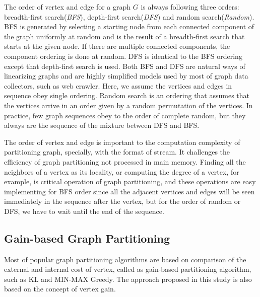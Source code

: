 \documentclass{sig-alternate-2013}
\begin{document}
The order of vertex and edge for a graph $G$ is always following three orders: breadth-first search(\textit{BFS}), depth-first search(\textit{DFS}) and random search(\textit{Random}). BFS is generated by selecting a starting node from each connected component of the graph uniformly at random and is the result of a breadth-first search that starts at the given node. If there are multiple connected components, the component ordering is done at random. DFS is identical to the BFS ordering except that depth-first search is used. Both BFS and DFS are natural ways of linearizing graphs and are highly simplified models used by most of graph data collectors, such as web crawler. Here, we assume the vertices and edges in sequence obey single ordering. Random search is an ordering that assumes that the vertices arrive in an order given by a random permutation of the vertices. In practice, few graph sequences obey to the order of complete random, but they always are the sequence of the mixture between DFS and BFS.

The order of vertex and edge is important to the computation complexity of partitioning graph, specially, with the format of stream. It challenges the efficiency of graph partitioning not processed in main memory. Finding all the neighbors of a vertex as its locality, or computing the degree of a vertex, for example, is critical operation of graph partitioning, and these operations are easy implementing for BFS order since all the adjacent vertices and edges will be seen immediately in the sequence after the vertex, but for the order of random or DFS, we have to wait until the end of the sequence.

\subsection{Gain-based Graph Partitioning}
Most of popular graph partitioning algorithms are based on comparison of the external and internal cost of vertex, called as gain-based partitioning algorithm, such as KL and MIN-MAX Greedy. The approach proposed in this study is also based on the concept of vertex gain.
\end{document}
